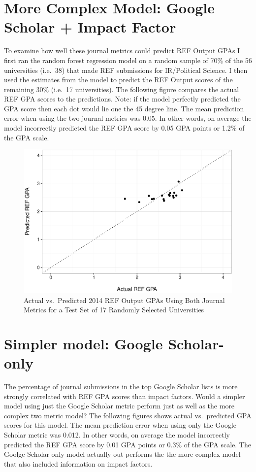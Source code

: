 \documentclass[]{article}
\begin{document}
\section{More Complex Model: Google Scholar + Impact
Factor}\label{more-complex-model-google-scholar-impact-factor}

To examine how well these journal metrics could predict REF Output GPAs
I first ran the random forest regression model on a random sample of
70\% of the 56 universities (i.e.~38) that made REF submissions for
IR/Political Science. I then used the estimates from the model to
predict the REF Output scores of the remaining 30\% (i.e.~17
universities). The following figure compares the actual REF GPA scores
to the predictions. Note: if the model perfectly predicted the GPA score
then each dot would lie one the 45 degree line. The mean prediction
error when using the two journal metrics was 0.05. In other words, on
average the model incorrectly predicted the REF GPA score by 0.05 GPA
points or 1.2\% of the GPA scale.

\begin{figure}[htbp]
\centering
\includegraphics{README_files/figure-latex/unnamed-chunk-1-1.pdf}
\caption{Actual vs.~Predicted 2014 REF Output GPAs Using Both Journal
Metrics for a Test Set of 17 Randomly Selected Universities}
\end{figure}

\section{Simpler model: Google
Scholar-only}\label{simpler-model-google-scholar-only}

The percentage of journal submissions in the top Google Scholar lists is
more strongly correlated with REF GPA scores than impact factors. Would
a simpler model using just the Google Scholar metric perform just as
well as the more complex two metric model? The following figures shows
actual vs.~predicted GPA scores for this model. The mean prediction
error when using only the Google Scholar metric was 0.012. In other
words, on average the model incorrectly predicted the REF GPA score by
0.01 GPA points or 0.3\% of the GPA scale. The Goolge Scholar-only model
actually out performs the the more complex model that also included
information on impact factors.
\end{document}
